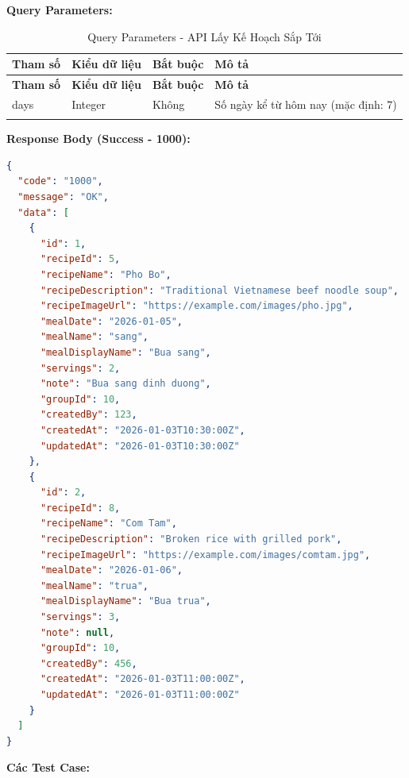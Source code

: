 \textbf{Query Parameters:}

\small
\begin{longtable}{|>{\raggedright\arraybackslash}p{3cm}|>{\raggedright\arraybackslash}p{2.5cm}|>{\raggedright\arraybackslash}p{2cm}|>{\raggedright\arraybackslash}p{6cm}|}
\hline
\textbf{Tham số} & \textbf{Kiểu dữ liệu} & \textbf{Bắt buộc} & \textbf{Mô tả} \\
\hline
\endfirsthead
\hline
\textbf{Tham số} & \textbf{Kiểu dữ liệu} & \textbf{Bắt buộc} & \textbf{Mô tả} \\
\hline
\endhead
days & Integer & Không & Số ngày kể từ hôm nay (mặc định: 7) \\
\hline
\caption{Query Parameters - API Lấy Kế Hoạch Sắp Tới}
\end{longtable}

\textbf{Response Body (Success - 1000):}

\begin{lstlisting}[language=json, caption=Response thanh cong API 2.8]
{
  "code": "1000",
  "message": "OK",
  "data": [
    {
      "id": 1,
      "recipeId": 5,
      "recipeName": "Pho Bo",
      "recipeDescription": "Traditional Vietnamese beef noodle soup",
      "recipeImageUrl": "https://example.com/images/pho.jpg",
      "mealDate": "2026-01-05",
      "mealName": "sang",
      "mealDisplayName": "Bua sang",
      "servings": 2,
      "note": "Bua sang dinh duong",
      "groupId": 10,
      "createdBy": 123,
      "createdAt": "2026-01-03T10:30:00Z",
      "updatedAt": "2026-01-03T10:30:00Z"
    },
    {
      "id": 2,
      "recipeId": 8,
      "recipeName": "Com Tam",
      "recipeDescription": "Broken rice with grilled pork",
      "recipeImageUrl": "https://example.com/images/comtam.jpg",
      "mealDate": "2026-01-06",
      "mealName": "trua",
      "mealDisplayName": "Bua trua",
      "servings": 3,
      "note": null,
      "groupId": 10,
      "createdBy": 456,
      "createdAt": "2026-01-03T11:00:00Z",
      "updatedAt": "2026-01-03T11:00:00Z"
    }
  ]
}
\end{lstlisting}

\textbf{Các Test Case:}

